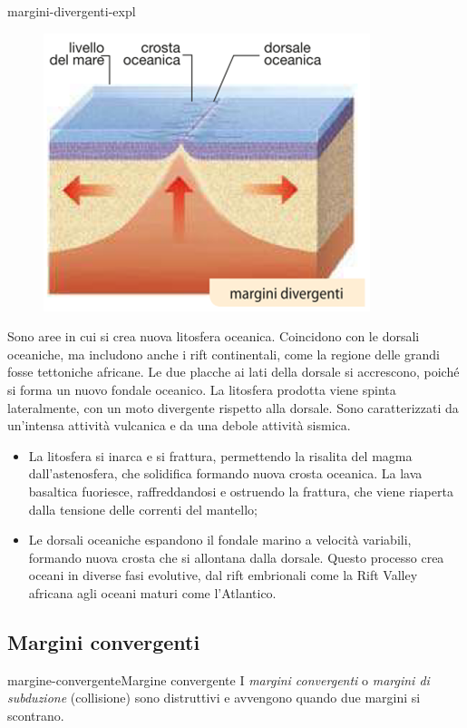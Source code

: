\documentclass[preview]{standalone}
\begin{document}
\begin{snippet}{margini-divergenti-expl}
    \setlength{\intextsep}{0pt}%
    \begin{figure}
        \includegraphics[width=.4\textwidth]{resources/margini-divergenti.png}
    \end{figure}

    Sono aree in cui si crea nuova litosfera oceanica. Coincidono con le dorsali oceaniche,
    ma includono anche i rift continentali, come la regione delle grandi fosse tettoniche
    africane. Le due placche ai lati della dorsale si accrescono, poiché si forma un nuovo
    fondale oceanico. La litosfera prodotta viene spinta lateralmente, con un moto
    divergente rispetto alla dorsale. Sono caratterizzati da un'intensa
    attività vulcanica e da una debole attività sismica.
    \wrapfill
    \vspace{-1cm}
    \begin{itemize}
        \item La litosfera si inarca e si frattura, permettendo la risalita del magma
            dall'astenosfera, che solidifica formando nuova crosta oceanica. La lava basaltica
            fuoriesce, raffreddandosi e ostruendo la frattura, che viene riaperta dalla tensione
            delle correnti del mantello;
        \item Le dorsali oceaniche espandono il fondale marino a velocità variabili, formando
            nuova crosta che si allontana dalla dorsale. Questo processo crea oceani in diverse
            fasi evolutive, dal rift embrionali come la Rift Valley africana agli oceani maturi
            come l'Atlantico.
    \end{itemize}
\end{snippet}

\subsection{Margini convergenti}

\begin{snippetdefinition}{margine-convergente}{Margine convergente}
    I \textit{margini convergenti} o \textit{margini di subduzione} (collisione) sono distruttivi e
    avvengono quando due margini si scontrano.
\end{snippetdefinition}
\end{document}
